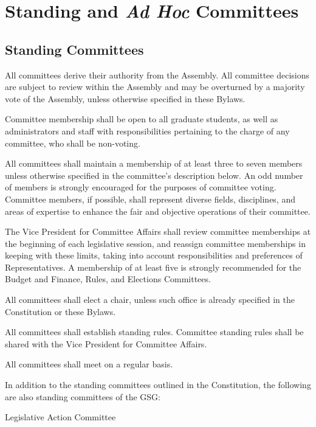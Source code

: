 \chapter{Standing and \textit{Ad Hoc} Committees}

\section{Standing Committees}
\begin{bylaws-number}
  \item All committees derive their authority from the Assembly. All committee decisions are subject to review within the Assembly and may be overturned by a majority vote of the Assembly, unless otherwise specified in these Bylaws.
  \item Committee membership shall be open to all graduate students, as well as administrators and staff with responsibilities pertaining to the charge of any committee, who shall be non-voting.
  \item All committees shall maintain a membership of at least three to seven members unless otherwise specified in the committee’s description below. An odd number of members is strongly encouraged for the purposes of committee voting. Committee members, if possible, shall represent diverse fields, disciplines, and areas of expertise to enhance the fair and objective operations of their committee.
  \item The Vice President for Committee Affairs shall review committee memberships at the beginning of each legislative session, and reassign committee memberships in keeping with these limits, taking into account responsibilities and preferences of Representatives. A membership of at least five is strongly recommended for the Budget and Finance, Rules, and Elections Committees.
  \item All committees shall elect a chair, unless such office is already specified in the Constitution or these Bylaws.
  \item All committees shall establish standing rules. Committee standing rules shall be shared with the Vice President for Committee Affairs.
  \item All committees shall meet on a regular basis.
  \item In addition to the standing committees outlined in the Constitution, the following are also standing committees of the GSG:
  \begin{bylaws-number}
    \item Legislative Action Committee \hfill \\

\end{bylaws-number}
\end{bylaws-number}
